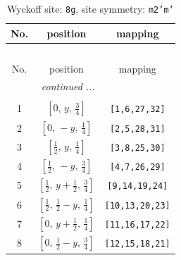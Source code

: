 \documentclass[fleqn,8pt]{jsarticle}
\begin{document}
\begin{longtable}{ccc}
\caption{Wyckoff site: {\tt 8g}, site symmetry: {\tt m2'm'}}
 \\
 \hline \hline
No. & position & mapping \\ \hline \endfirsthead

\multicolumn{2}{l}{\tablename\ \thetable{}} \\
 \hline \hline
No. & position & mapping \\ \hline \endhead

 \hline \hline
\multicolumn{2}{r}{\footnotesize\it continued ...} \\ \endfoot

 \hline \hline
\multicolumn{2}{r}{} \\ \endlastfoot

1 & $\left[ 0,\, y,\, \frac{3}{4} \right]$ & {\tt [1,6,27,32]} \\ \hline
2 & $\left[ 0,\, - y,\, \frac{1}{4} \right]$ & {\tt [2,5,28,31]} \\ \hline
3 & $\left[ \frac{1}{2},\, y,\, \frac{1}{4} \right]$ & {\tt [3,8,25,30]} \\ \hline
4 & $\left[ \frac{1}{2},\, - y,\, \frac{3}{4} \right]$ & {\tt [4,7,26,29]} \\ \hline
5 & $\left[ \frac{1}{2},\, y + \frac{1}{2},\, \frac{3}{4} \right]$ & {\tt [9,14,19,24]} \\ \hline
6 & $\left[ \frac{1}{2},\, \frac{1}{2} - y,\, \frac{1}{4} \right]$ & {\tt [10,13,20,23]} \\ \hline
7 & $\left[ 0,\, y + \frac{1}{2},\, \frac{1}{4} \right]$ & {\tt [11,16,17,22]} \\ \hline
8 & $\left[ 0,\, \frac{1}{2} - y,\, \frac{3}{4} \right]$ & {\tt [12,15,18,21]} \\
\end{longtable}
\renewcommand{\arraystretch}{1.2}
\end{document}
